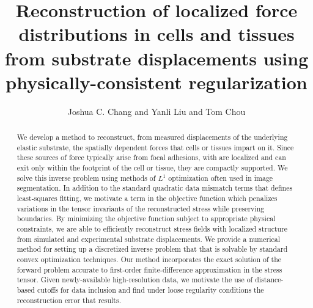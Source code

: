 \documentclass[aps,prl,reprint,twocolumn,groupedaddress,showpacs]{revtex4-1}
\begin{document}
\title{Reconstruction of localized force distributions in cells and tissues from substrate displacements using physically-consistent regularization}

\author{Joshua C. Chang and Yanli Liu and Tom Chou} 






\begin{abstract}
We develop a method to reconstruct, from measured displacements of the
underlying elastic substrate, the spatially dependent forces that
cells or tissues impart on it. Since these sources of force typically
arise from focal adhesions, with are localized and can exit only
within the footprint of the cell or tissue, they are compactly
supported. We solve this inverse problem using methods of $L^{1}$
optimization often used in image segmentation. In addition to the
standard quadratic data mismatch terms that defines least-squares
fitting, we motivate a term in the objective function which penalizes
variations in the tensor invariants of the reconstructed stress while
preserving boundaries.  By minimizing the objective function subject
to appropriate physical constraints, we are able to efficiently
reconstruct stress fields with localized structure from simulated and
experimental substrate displacements. We provide a numerical method
for setting up a discretized inverse problem that that is solvable by
standard convex optimization techniques. Our method incorporates the
exact solution of the forward problem accurate to first-order
finite-difference approximation in the stress tensor. Given
newly-available high-resolution data, we motivate the use of
distance-based cutoffs for data inclusion and find under loose
regularity conditions the reconstruction error that results.
\end{abstract}
\maketitle
\end{document}
